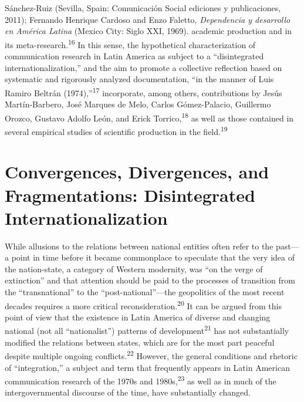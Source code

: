 \documentclass{tufte-handout}
\begin{document}
{  Sánchez-Ruiz (Sevilla, Spain: Comunicación Social ediciones y publicaciones,
  2011); Fernando Henrique Cardoso and Enzo Faletto, \emph{Dependencia y
  desarrollo en América Latina} (Mexico City: Siglo XXI, 1969).} academic production and
in its meta-research.\textsuperscript{16} In this sense, the hypothetical
characterization of communication research in Latin America as subject
to a ``disintegrated internationalization,'' and the aim to promote a
collective reflection based on systematic and rigorously analyzed
documentation, ``in the manner of Luis Ramiro Beltrán
(1974),''\textsuperscript{17} incorporate, among others, contributions
by Jesús Martín-Barbero, José Marques de Melo, Carlos
Gómez-Palacio, Guillermo Orozco, Gustavo Adolfo León, and Erick Torrico,\textsuperscript{18}
as well as those contained in several empirical studies of scientific
production in the field.\textsuperscript{19}

\hypertarget{convergences-divergences-and-fragmentations-disintegrated-internationalization}{%
\section{Convergences, Divergences, and Fragmentations: Disintegrated\\\noindent Internationalization}\label{convergences-divergences-and-fragmentations-disintegrated-internationalization}}

While allusions to the relations between national entities often refer
to the past---a point in time before it became commonplace to speculate
that the very idea of the nation-state, a category of Western modernity,
was ``on the verge of extinction'' and that attention should be paid to
the processes of transition from the ``transnational'' to the
``post-national''---the geopolitics of the most recent decades requires
a more critical reconsideration.\textsuperscript{20} It can be argued from this point
of view that the existence in Latin America of diverse and changing
national (not all ``nationalist'') patterns of development\textsuperscript{21} has not substantially
modified the relations between states, which are for the most part
peaceful despite multiple ongoing conflicts.\textsuperscript{22} However, the general conditions and rhetoric of
``integration,'' a subject and term that frequently appears in Latin
American communication research of the 1970s and 1980s,\textsuperscript{23} as well as in much of the intergovernmental discourse of the
time, have substantially changed.
\end{document}
